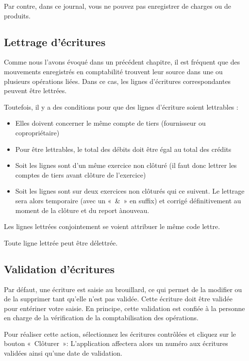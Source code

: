 \documentclass[a4paper,10pt,oneside,french]{sphinxmanual}
\begin{document}
Par contre, dans ce journal, vous ne pouvez pas enregistrer de charges ou de produits.


\subsection{Lettrage d’écritures}
\label{\detokenize{accounting/entity:lettrage-d-ecritures}}
Comme nous l’avons évoqué dans un précédent chapitre, il est fréquent que des mouvements enregistrés en comptabilité trouvent leur source dans une ou plusieurs opérations liées. Dans ce cas, les lignes d’écritures correspondantes peuvent être lettrées.

Toutefois, il y a des conditions pour que des lignes d’écriture soient lettrables :
\begin{itemize}
\item {} 
Elles doivent concerner le même compte de tiers (fournisseur ou copropriétaire)

\item {} 
Pour être lettrables, le total des débits doit être égal au total des crédits

\item {} 
Soit les lignes sont d’un même exercice non clôturé (il faut donc lettrer les comptes de tiers avant clôture de l’exercice)

\item {} 
Soit les lignes sont sur deux exercices non clôturés qui ce suivent. Le lettrage sera alors temporaire (avec un « \& » en suffix) et corrigé définitivement au moment de la clôture et du report à\sphinxhyphen{}nouveau.

\end{itemize}

Les lignes lettrées conjointement se voient attribuer le même code lettre.

Toute ligne lettrée peut être délettrée.


\subsection{Validation d’écritures}
\label{\detokenize{accounting/entity:validation-d-ecritures}}
Par défaut, une écriture est saisie au brouillard, ce qui permet de la modifier ou de la supprimer tant qu’elle n’est pas validée.
Cette écriture doit être validée pour entériner votre saisie. En principe, cette validation est confiée à la personne en charge de la vérification de la comptabilisation des opérations.

Pour réaliser cette action, sélectionnez les écritures contrôlées et cliquez sur le bouton « Clôturer »: L’application affectera alors un numéro aux écritures validées ainsi qu’une date de validation.
\end{document}
